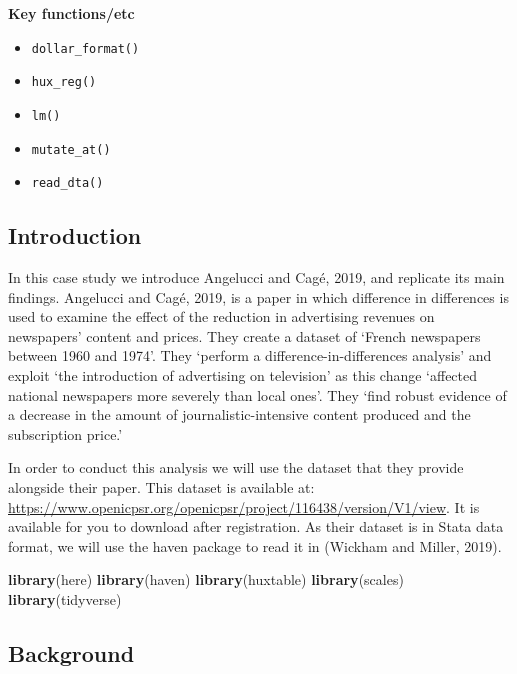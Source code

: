 \documentclass[
]{book}
\newenvironment{Shaded}{\begin{snugshade}}{\end{snugshade}}
\newcommand{\KeywordTok}[1]{\textcolor[rgb]{0.13,0.29,0.53}{\textbf{#1}}}
\newcommand{\NormalTok}[1]{#1}
\providecommand{\tightlist}{%
  \setlength{\itemsep}{0pt}\setlength{\parskip}{0pt}}
\begin{document}
\textbf{Key functions/etc}

\begin{itemize}
\tightlist
\item
  \texttt{dollar\_format()}
\item
  \texttt{hux\_reg()}
\item
  \texttt{lm()}
\item
  \texttt{mutate\_at()}
\item
  \texttt{read\_dta()}
\end{itemize}

\hypertarget{introduction-21}{%
\subsection{Introduction}\label{introduction-21}}

In this case study we introduce Angelucci and Cagé, 2019, and replicate its main findings. Angelucci and Cagé, 2019, is a paper in which difference in differences is used to examine the effect of the reduction in advertising revenues on newspapers' content and prices. They create a dataset of `French newspapers between 1960 and 1974'. They `perform a difference-in-differences analysis' and exploit `the introduction of advertising on television' as this change `affected national newspapers more severely than local ones'. They `find robust evidence of a decrease in the amount of journalistic-intensive content produced and the subscription price.'

In order to conduct this analysis we will use the dataset that they provide alongside their paper. This dataset is available at: \url{https://www.openicpsr.org/openicpsr/project/116438/version/V1/view}. It is available for you to download after registration. As their dataset is in Stata data format, we will use the haven package to read it in (Wickham and Miller, 2019).

\begin{Shaded}
\begin{Highlighting}[]
\KeywordTok{library}\NormalTok{(here)}
\KeywordTok{library}\NormalTok{(haven)}
\KeywordTok{library}\NormalTok{(huxtable)}
\KeywordTok{library}\NormalTok{(scales)}
\KeywordTok{library}\NormalTok{(tidyverse)}
\end{Highlighting}
\end{Shaded}

\hypertarget{background}{%
\subsection{Background}\label{background}}
\end{document}
